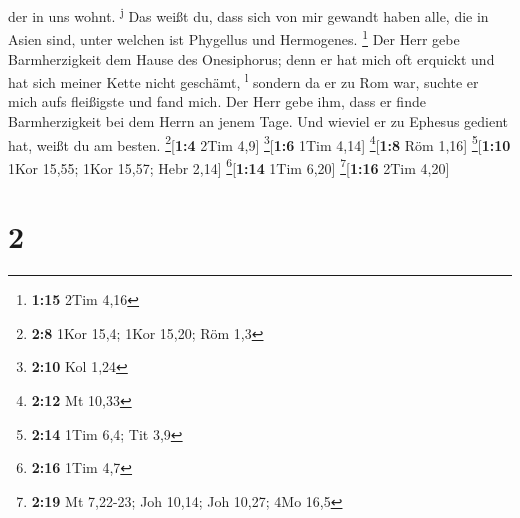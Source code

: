 der in uns wohnt. \textsuperscript{j}  Das weißt du, dass
sich von mir gewandt haben alle, die in Asien sind, unter welchen ist
Phygellus und Hermogenes. \footnote{\textbf{1:15} 2Tim 4,16}
 Der Herr gebe Barmherzigkeit dem Hause des Onesiphorus;
denn er hat mich oft erquickt und hat sich meiner Kette nicht geschämt,
\textsuperscript{l}  sondern da er zu Rom war, suchte er
mich aufs fleißigste und fand mich.  Der Herr gebe ihm,
dass er finde Barmherzigkeit bei dem Herrn an jenem Tage. Und wieviel er
zu Ephesus gedient hat, weißt du am besten. \footnote{\textbf{2:8} 1Kor
  15,4; 1Kor 15,20; Röm 1,3}{[}\textbf{1:4} 2Tim 4,9{]}
\footnote{\textbf{2:10} Kol 1,24}{[}\textbf{1:6} 1Tim 4,14{]}
\footnote{\textbf{2:12} Mt 10,33}{[}\textbf{1:8} Röm 1,16{]}
\footnote{\textbf{2:14} 1Tim 6,4; Tit 3,9}{[}\textbf{1:10} 1Kor 15,55;
1Kor 15,57; Hebr 2,14{]} \footnote{\textbf{2:16} 1Tim 4,7}{[}\textbf{1:14}
1Tim 6,20{]} \footnote{\textbf{2:19} Mt 7,22-23; Joh 10,14; Joh 10,27;
  4Mo 16,5}{[}\textbf{1:16} 2Tim 4,20{]}

\hypertarget{section-1}{%
\section{2}\label{section-1}}

